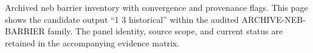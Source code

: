 Archived neb barrier inventory with convergence and provenance flags. This page shows the candidate output ``1 3 historical'' within the audited ARCHIVE-NEB-BARRIER family. The panel identity, source scope, and current status are retained in the accompanying evidence matrix.
